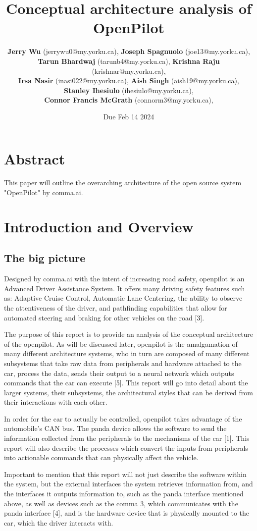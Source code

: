 \documentclass[12pt]{article}
\title{Conceptual architecture analysis of OpenPilot}
\author{
    \textbf{Jerry Wu} (jerrywu0@my.yorku.ca), \textbf{Joseph Spagnuolo} (joe13@my.yorku.ca),\\ \textbf{Tarun Bhardwaj} (tarunb4@my.yorku.ca),
    \textbf{Krishna Raju} (krishnar@my.yorku.ca),\\ \textbf{Irsa Nasir} (inasi022@my.yorku.ca),
    \textbf{Aish Singh} (aish19@my.yorku.ca),\\ \textbf{Stanley Ihesiulo} (ihesiulo@my.yorku.ca),\\
    \textbf{Connor Francis McGrath} (connorm3@my.yorku.ca),
}
\date{Due Feb 14 2024}
\begin{document}
\maketitle
\tableofcontents


\newpage


\section{Abstract}
This paper will outline the overarching architecture of the open source system "OpenPilot" by comma.ai.

\section{Introduction and Overview}

\subsection{The big picture}
Designed by comma.ai with the intent of increasing road safety, openpilot is an Advanced Driver Assistance System. It offers many driving safety features such as: Adaptive Cruise Control, Automatic Lane Centering, the ability to observe the attentiveness of the driver, and pathfinding capabilities that allow for automated steering and braking for other vehicles on the road [3].

The purpose of this report is to provide an analysis of the conceptual architecture of the openpilot. As will be discussed later, openpilot is the amalgamation of many different architecture systems, who in turn are composed of many different subsystems that take raw data from peripherals and hardware attached to the car, process the data, sends their output to a neural network which outputs commands that the car can execute [5]. This report will go into detail about the larger systems, their subsystems, the architectural styles that can be derived from their interactions with each other.

In order for the car to actually be controlled, openpilot takes advantage of the automobile’s CAN bus. The panda device allows the software to send the information collected from the peripherals to the mechanisms of the car [1]. This report will also describe the processes which convert the inputs from peripherals into actionable commands that can physically affect the vehicle.

Important to mention that this report will not just describe the software within the system, but the external interfaces the system retrieves information from, and the interfaces it outputs information to, such as the panda interface mentioned above, as well as devices such as the comma 3, which communicates with the panda interface [4], and is the hardware device that is physically mounted to the car, which the driver interacts with.
\end{document}
